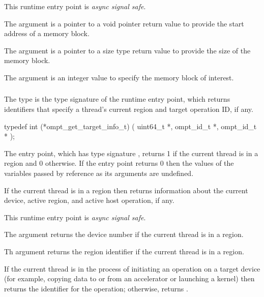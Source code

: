 This runtime entry point is \emph{async signal safe}.

\argdesc
The  argument is a pointer to a void pointer return value
to provide the start address of a memory block.  

The  argument is a pointer to a size type return
value to provide the size of the memory block.

The  argument is an integer value to specify the
memory block of interest.



\subsubsection{}
\label{sec:ompt_get_target_info_t}
\label{sec:ompt_get_target_info}

\summary
The  type is the type signature of the 
 runtime entry point, which returns identifiers 
that specify a thread's current  region and target operation ID, if any.

\format
\begin{ccppspecific}
\begin{omptInquiry}
typedef int (*ompt_get_target_info_t) (
  uint64_t *,
  ompt_id_t *,
  ompt_id_t *
);
\end{omptInquiry}
\end{ccppspecific}

\descr
The  entry point, which has type signature 
, returns 1 if the current thread is in a 
 region and 0 otherwise. If the entry point returns 0 then
the values of the variables passed by reference as its arguments are undefined.

If the current thread is in a  region then 
returns information about the current device, active  region, and
active host operation, if any.

This runtime entry point is \emph{async signal safe}.

\argdesc
The  argument returns the device number if the current 
thread is in a  region.

Th  argument returns the  region identifier 
if the current thread is in a  region.

If the current thread is in the process of initiating an operation on a 
target device (for example, copying data to or from an accelerator or 
launching a kernel) then  returns the identifier for the 
operation; otherwise,  returns .

